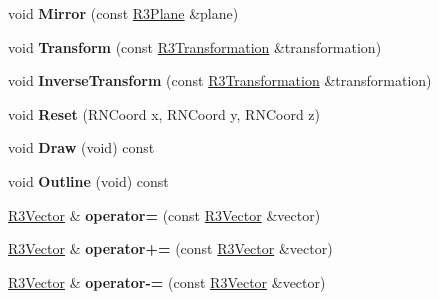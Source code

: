 \begin{DoxyCompactItemize}
\item 
void {\bfseries Mirror} (const \hyperlink{class_r3_plane}{R3\+Plane} \&plane)\hypertarget{class_r3_vector_a09a7ac1fa01f90af9da71623aadf9638}{}\label{class_r3_vector_a09a7ac1fa01f90af9da71623aadf9638}

\item 
void {\bfseries Transform} (const \hyperlink{class_r3_transformation}{R3\+Transformation} \&transformation)\hypertarget{class_r3_vector_a9736ff3339b5f2188b2ab264386e61ec}{}\label{class_r3_vector_a9736ff3339b5f2188b2ab264386e61ec}

\item 
void {\bfseries Inverse\+Transform} (const \hyperlink{class_r3_transformation}{R3\+Transformation} \&transformation)\hypertarget{class_r3_vector_ab3af0705949224b619ead319e7f083ee}{}\label{class_r3_vector_ab3af0705949224b619ead319e7f083ee}

\item 
void {\bfseries Reset} (R\+N\+Coord x, R\+N\+Coord y, R\+N\+Coord z)\hypertarget{class_r3_vector_ac4029a2b0993f6694ae8e2a32622c2ce}{}\label{class_r3_vector_ac4029a2b0993f6694ae8e2a32622c2ce}

\item 
void {\bfseries Draw} (void) const \hypertarget{class_r3_vector_a49b3c9f4554b703057274c17f1815bf0}{}\label{class_r3_vector_a49b3c9f4554b703057274c17f1815bf0}

\item 
void {\bfseries Outline} (void) const \hypertarget{class_r3_vector_a6697d777fac7af125a9b4d32e3689f60}{}\label{class_r3_vector_a6697d777fac7af125a9b4d32e3689f60}

\item 
\hyperlink{class_r3_vector}{R3\+Vector} \& {\bfseries operator=} (const \hyperlink{class_r3_vector}{R3\+Vector} \&vector)\hypertarget{class_r3_vector_a8536f8f8027b3cac9b8a68f3cf828e96}{}\label{class_r3_vector_a8536f8f8027b3cac9b8a68f3cf828e96}

\item 
\hyperlink{class_r3_vector}{R3\+Vector} \& {\bfseries operator+=} (const \hyperlink{class_r3_vector}{R3\+Vector} \&vector)\hypertarget{class_r3_vector_a83a00e5f30f63420d29817dc12bd2454}{}\label{class_r3_vector_a83a00e5f30f63420d29817dc12bd2454}

\item 
\hyperlink{class_r3_vector}{R3\+Vector} \& {\bfseries operator-\/=} (const \hyperlink{class_r3_vector}{R3\+Vector} \&vector)\hypertarget{class_r3_vector_affedfdb4ccd5135fe0ad7ef25abe4d64}{}\label{class_r3_vector_affedfdb4ccd5135fe0ad7ef25abe4d64}


\end{DoxyCompactItemize}
